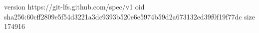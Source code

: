 version https://git-lfs.github.com/spec/v1
oid sha256:60cff2809e5f54d3221a3dc9393b520e6e5974b59d2a673132ed39f0f19f77dc
size 174916
